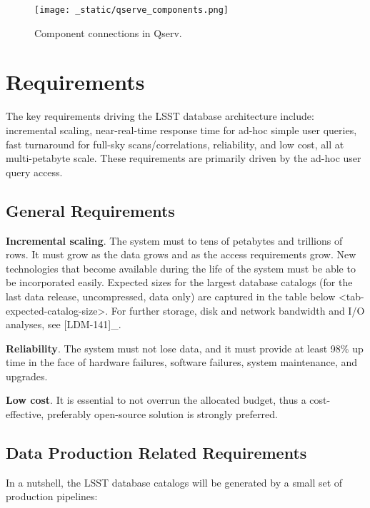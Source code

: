 \documentclass[DM,lsstdraft,toc]{lsstdoc}
\begin{document}
\begin{figure}[H]
\centering
\texttt{[image: \_static/qserve\_components.png]}
\caption{Component connections in Qserv.}
\end{figure}

\section{Requirements}\label{requirements}

The key requirements driving the LSST database architecture include:
incremental scaling, near-real-time response time for ad-hoc simple user
queries, fast turnaround for full-sky scans/correlations, reliability,
and low cost, all at multi-petabyte scale. These requirements are
primarily driven by the ad-hoc user query access.

\subsection{General Requirements}\label{general-requirements}

\textbf{Incremental scaling}. The system must to tens of petabytes and
trillions of rows. It must grow as the data grows and as the access
requirements grow. New technologies that become available during the
life of the system must be able to be incorporated easily. Expected
sizes for the largest database catalogs (for the last data release,
uncompressed, data only) are captured in
the table below \textless{}tab-expected-catalog-size\textgreater{}. For
further storage, disk and network bandwidth and I/O analyses, see
{[}LDM-141{]}\_.

\textbf{Reliability}. The system must not lose data, and it must provide
at least 98\% up time in the face of hardware failures, software
failures, system maintenance, and upgrades.

\textbf{Low cost}. It is essential to not overrun the allocated budget,
thus a cost-effective, preferably open-source solution is strongly
preferred.

\subsection{Data Production Related
Requirements}\label{data-production-related-requirements}

In a nutshell, the LSST database catalogs will be generated by a small
set of production pipelines:
\end{document}
